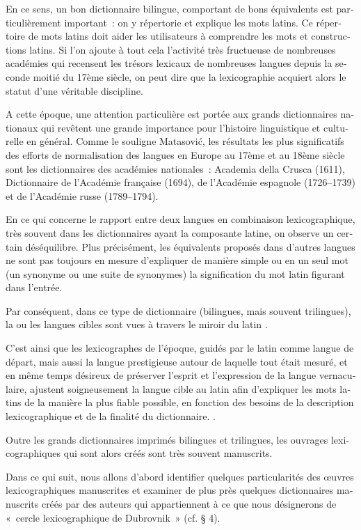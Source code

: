 \documentclass[output=paper,colorlinks,citecolor=brown,arabicfont,chinesefont,booklanguage=french]{langscibook}
\begin{document}
\begin{otherlanguage}{french}
En ce sens, un bon dictionnaire bilingue, comportant de bons équivalents est particulièrement important~: on y répertorie et explique les mots latins. Ce répertoire de mots latins doit aider les utilisateurs à comprendre les mots et constructions latins. Si l’on ajoute à tout cela l’activité très fructueuse de nombreuses académies qui recensent les trésors lexicaux de nombreuses langues depuis la seconde moitié du 17ème siècle, on peut dire que la lexicographie acquiert alors le statut d’une véritable discipline. 


A cette époque, une attention particulière est portée aux grands dictionnaires nationaux qui revêtent une grande importance pour l'histoire linguistique et culturelle en général. Comme le souligne Matasović, les résultats les plus significatifs des efforts de normalisation des langues en Europe au 17ème et au 18ème siècle sont les dictionnaires des académies nationales~: Academia della Crusca (1611), Dictionnaire de l’Académie française (1694), de l’Académie espagnole (1726--1739) et de l’Académie russe (1789--1794). \citep[514]{Matasovic2013}

En ce qui concerne le rapport entre deux langues en combinaison lexicographique, très souvent dans les dictionnaires ayant la composante latine, on observe un certain déséquilibre. Plus précisément, les équivalents proposés dans d’autres langues ne sont pas toujours en mesure d’expliquer de manière simple ou en un seul mot (un synonyme ou une suite de synonymes) la signification du mot latin figurant dans l’entrée. 

Par conséquent, dans ce type de dictionnaire (bilingues, mais souvent trilingues), la ou les langues cibles sont vues à travers le miroir du latin \citep[34]{Furno2003}.

C’est ainsi que les lexicographes de l’époque, guidés par le latin comme langue de départ, mais aussi la langue prestigieuse autour de laquelle tout était mesuré, et en même temps désireux de préserver l’esprit et l’expression de la langue vernaculaire, ajustent soigneusement la langue cible au latin afin d’expliquer les mots latins de la manière la plus fiable possible, en fonction des besoins de la description lexicographique et de la finalité du dictionnaire. \citep[28--29]{Furno2003}.

Outre les grands dictionnaires imprimés bilingues et trilingues, les ouvrages lexicographiques qui sont alors créés sont très souvent manuscrits. 

Dans ce qui suit, nous allons d’abord identifier quelques particularités des œuvres lexicographiques manuscrites et examiner de plus près quelques dictionnaires manuscrits créés par des auteurs qui appartiennent à ce que nous désignerons de «~cercle lexicographique de Dubrovnik~» (cf. § 4).


\end{otherlanguage}
\end{document}
